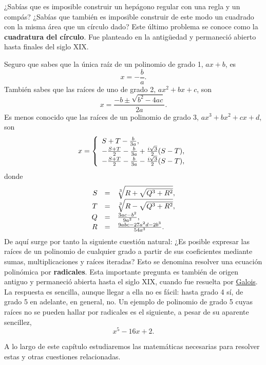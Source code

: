 
¿Sabías que es imposible construir un hepágono regular con una regla y
un compás? ¿Sabías que también es imposible construir de este modo un
cuadrado con la misma área que un círculo dado? Este último problema se
conoce como la \textbf{cuadratura del círculo}. Fue planteado en la
antigüedad y permaneció abierto hasta finales del siglo XIX.

Seguro que sabes que la única raíz de un polinomio de grado 1, \(ax+b\),
es \[x=-\frac{b}{a}.\] También sabes que las raíces de uno de grado 2,
\(ax^2+bx+c\), son \[x=\frac{-b\pm\sqrt{b^2-4ac}}{2a}.\] Es menos
conocido que las raíces de un polinomio de grado 3, \(ax^3+bx^2+cx+d\),
son \[
x=
\left\{
\begin{array}{l}
S+T-\frac{b}{3a},\cr
-\frac{S+T}{2}-\frac{b}{3a}+\frac{i\sqrt{3}}{2}(S-T),\cr
-\frac{S+T}{2}-\frac{b}{3a}-\frac{i\sqrt{3}}{2}(S-T),
\end{array}
\right.
\] donde \[
\begin{array}{rcl}
S&=&\sqrt[3]{R+\sqrt{Q^3+R^2}},\cr
T&=&\sqrt[3]{R-\sqrt{Q^3+R^2}},\cr
Q&=&\frac{3ac-b^2}{9a^2},\cr
R&=&\frac{9abc-27a^2d-2b^3}{54a^3}.
\end{array}
\] De aquí surge por tanto la siguiente cuestión natural: ¿Es posible
expresar las raíces de un polinomio de cualquier grado a partir de sus
coeficientes mediante sumas, multiplicaciones y raíces iteradas? Esto se
denomina resolver una ecuación polinómica por \textbf{radicales}. Esta
importante pregunta es también de origen antiguo y permaneció abierta
hasta el siglo XIX, cuando fue resuelta por
\href{https://en.wikipedia.org/wiki/\%C3\%89variste_Galois}{Galois}. La
respuesta es sencilla, aunque llegar a ella no es fácil: hasta grado 4
sí, de grado 5 en adelante, en general, no. Un ejemplo de polinomio de
grado 5 cuyas raíces no se pueden hallar por radicales es el siguiente,
a pesar de su aparente sencillez, \[x^5-16x+2.\]

A lo largo de este capítulo estudiaremos las matemáticas necesarias para
resolver estas y otras cuestiones relacionadas.
